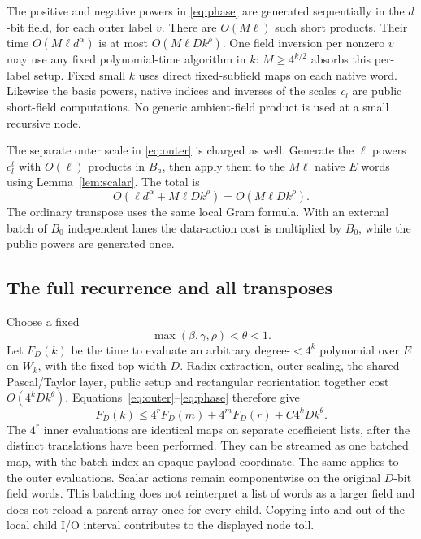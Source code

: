 The positive and negative powers in \eqref{eq:phase} are generated
sequentially in the $d$-bit field, for each outer label $v$. There
are $O(M\ell)$ such short products. Their time
$O(M\ell d^\alpha)$ is at most $O(M\ell Dk^\rho)$.
One field inversion per nonzero $v$ may use any fixed polynomial-time
algorithm in $k$: $M\geq4^{k/2}$ absorbs this per-label setup.
Fixed small $k$ uses direct fixed-subfield maps on each native word.
Likewise the basis powers, native indices and inverses of the scales
$c_l$ are public short-field computations. No generic ambient-field
product is used at a small recursive node.

The separate outer scale in \eqref{eq:outer} is charged as well.
Generate the $\ell$ powers $c_l^t$ with $O(\ell)$ products in $B_a$,
then apply them to the $M\ell$ native $E$ words using
Lemma~\ref{lem:scalar}. The total is
\[
 O(\ell d^\alpha+M\ell Dk^\rho)=O(M\ell Dk^\rho).
\]
The ordinary transpose uses the same local Gram formula. With an
external batch of $B_0$ independent lanes the data-action cost is
multiplied by $B_0$, while the public powers are generated once.

\subsection{The full recurrence and all transposes}
Choose a fixed
\begin{equation}\label{eq:theta}
 \max(\beta,\gamma,\rho)<\theta<1.
\end{equation}
Let $F_D(k)$ be the time to evaluate an arbitrary degree-$<4^k$
polynomial over $E$ on $W_k$, with the fixed top width $D$.
Radix extraction, outer scaling, the shared Pascal/Taylor layer,
public setup and rectangular reorientation together cost
$O(4^kDk^\theta)$. Equations~\eqref{eq:outer}--\eqref{eq:phase}
therefore give
\begin{equation}\label{eq:recurrence}
 F_D(k)\leq4^rF_D(m)+4^mF_D(r)+C4^kDk^\theta.
\end{equation}
The $4^r$ inner evaluations are identical maps on separate coefficient
lists, after the distinct translations have been performed. They can
be streamed as one batched map, with the batch index an opaque payload
coordinate. The same applies to the outer evaluations. Scalar actions
remain componentwise on the original $D$-bit field words. This batching
does not reinterpret a list of words as a larger field and does not
reload a parent array once for every child. Copying into and out of
the local child I/O interval contributes to the displayed node toll.

